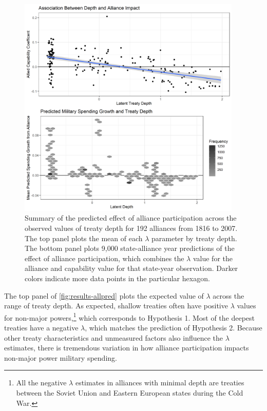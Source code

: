 \documentclass[12pt]{article}
\begin{document}
\begin{figure}[htbp]
	\centering
		\includegraphics[width=0.95\textwidth]{../figures/results-allpred.png}
	\caption{Summary of the predicted effect of alliance participation across the observed values of treaty depth for 192 alliances from 1816 to 2007. The top panel plots the mean of each $\lambda$ parameter by treaty depth. The bottom panel plots 9,000 state-alliance year predictions of the effect of alliance participation, which combines the $\lambda$ value for the alliance and capability value for that state-year observation. Darker colors indicate more data points in the particular hexagon.}
	\label{fig:results-allpred}
\end{figure}


The top panel of \autoref{fig:results-allpred} plots the expected value of $\lambda$ across the range of treaty depth. 
As expected, shallow treaties often have positive $\lambda$ values for non-major powers,\footnote{All the negative $\lambda$ estimates in alliances with minimal depth are treaties between the Soviet Union and Eastern European states during the Cold War.} which corresponds to Hypothesis 1. 
Most of the deepest treaties have a negative $\lambda$, which matches the prediction of Hypothesis 2. 
Because other treaty characteristics and unmeasured factors also influence the $\lambda$ estimates, there is tremendous variation in how alliance participation impacts non-major power military spending. 
\end{document}
